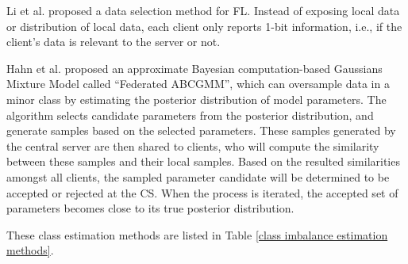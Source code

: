 \documentclass[10pt,journal,compsoc]{IEEEtran}
\begin{document}
Li et al. \cite{li2021sample} proposed a data selection method for FL. Instead of exposing local data or distribution of local data, each client only reports 1-bit information, i.e., if the client's data is relevant to the server or not. 

Hahn et al. \cite{hahn2019privacy} proposed an approximate Bayesian computation-based Gaussians Mixture Model called ``Federated ABCGMM'', which can oversample data in a minor class by estimating the posterior distribution of model parameters. The algorithm selects candidate parameters from the posterior distribution, and generate samples based on the selected parameters. These samples generated by the central server are then shared to clients, who will compute the similarity between these samples and their local samples. Based on the resulted similarities amongst all clients, the sampled parameter candidate will be determined to be accepted or rejected at the CS. When the process is iterated, the accepted set of parameters becomes close to its true posterior distribution.

These class estimation methods are listed in Table \ref{class imbalance estimation methods}.
\vspace{-0.3cm}
\end{document}
